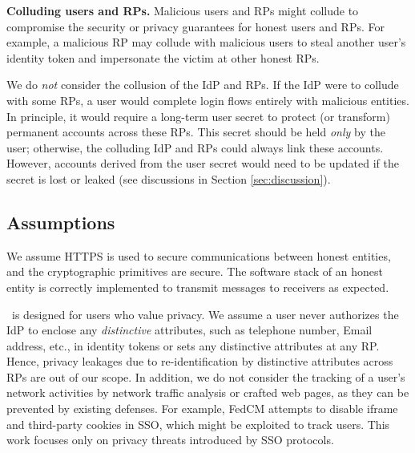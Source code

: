 \noindent \textbf{Colluding users and RPs.}
Malicious users and RPs might collude to compromise the security or privacy guarantees for honest users and RPs.
For example, a malicious RP may collude with malicious users to steal another user's identity token and impersonate the victim at other honest RPs.

We do \emph{not} consider the collusion of the IdP and RPs.
If the IdP were to collude with some RPs, a user would complete login flows entirely with malicious entities.
In principle, it would require a long-term user secret to protect (or transform) permanent accounts across these RPs.
This secret should be held \emph{only} by the user; otherwise, the colluding IdP and RPs could always link these accounts.
However, accounts derived from the user secret would need to be updated if the secret is lost or leaked (see discussions in Section \ref{sec:discussion}).


\subsection{Assumptions}
We assume HTTPS is used to secure communications between honest entities, and the cryptographic primitives are secure. The software stack of an honest entity is correctly implemented to transmit messages to receivers as expected.

\usso~is designed for users who value privacy. We assume a user never authorizes the IdP to enclose any \emph{distinctive} attributes, such as telephone number, Email address, etc., in identity tokens or sets any distinctive attributes at any RP. Hence, privacy leakages due to re-identification by distinctive attributes across RPs are out of our scope.
In addition, we do not consider the tracking of a user's network activities by network traffic analysis or crafted web pages, as they can be prevented by existing defenses. For example, FedCM \cite{FedCM} attempts to disable iframe and third-party cookies in SSO, which might be exploited to track users. This work focuses only on privacy threats introduced by SSO protocols.



